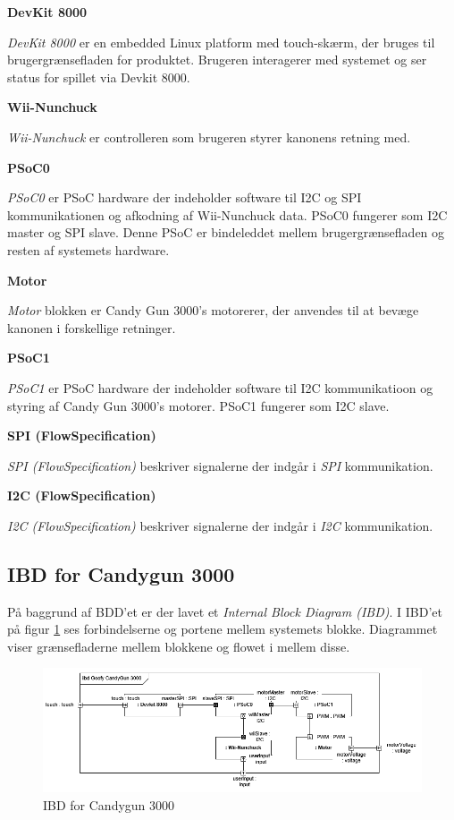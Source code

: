 \noindent \textbf{DevKit 8000} \par
\noindent \textit{DevKit 8000} er en embedded Linux platform med touch-skærm, der bruges til brugergrænsefladen for produktet. Brugeren interagerer med systemet og ser status for spillet via Devkit 8000. 

\noindent \textbf{Wii-Nunchuck} \par
\noindent \textit{Wii-Nunchuck} er controlleren som brugeren styrer kanonens retning med.

\noindent \textbf{PSoC0} \par
\noindent \textit{PSoC0} er PSoC hardware der indeholder software til I2C og SPI kommunikationen og afkodning af Wii-Nunchuck data. PSoC0 fungerer som I2C master og SPI slave. Denne PSoC er bindeleddet mellem brugergrænsefladen og resten af systemets hardware.

\noindent \textbf{Motor} \par
\noindent \textit{Motor} blokken er Candy Gun 3000's motorerer, der anvendes til at bevæge kanonen i forskellige retninger.

\noindent \textbf{PSoC1} \par
\noindent \textit{PSoC1} er PSoC hardware der indeholder software til I2C kommunikatioon og styring af Candy Gun 3000's motorer. PSoC1 fungerer som I2C slave.


\noindent \textbf{SPI (FlowSpecification)} \par
\noindent \textit{SPI (FlowSpecification)} beskriver signalerne der indgår i \textit{SPI} kommunikation.

\noindent \textbf{I2C (FlowSpecification)} \par
\noindent \textit{I2C (FlowSpecification)} beskriver signalerne der indgår i \textit{I2C} kommunikation.
\subsection{IBD for Candygun 3000}
På baggrund af BDD'et er der lavet et \textit{Internal Block Diagram (IBD)}. I IBD'et på figur \ref{fig:IBD} ses forbindelserne og portene mellem systemets blokke. Diagrammet viser grænsefladerne mellem blokkene og flowet i mellem disse. 

\begin{figure}[H]
	\centering
	\includegraphics[width=\textwidth]{Systemarkitektur/images/GoofyCandyIBDImageRev2.png}
	\caption{IBD for Candygun 3000}
	\label{fig:IBD}
\end{figure}

